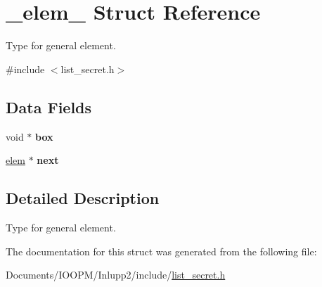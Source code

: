 \hypertarget{struct__elem__}{}\section{\+\_\+elem\+\_\+ Struct Reference}
\label{struct__elem__}


Type for general element.  




{\ttfamily \#include $<$list\+\_\+secret.\+h$>$}

\subsection*{Data Fields}
\begin{DoxyCompactItemize}
\item 
\hypertarget{struct__elem___af06c82a131c92d169d94c8602c64f757}{}void $\ast$ {\bfseries box}\label{struct__elem___af06c82a131c92d169d94c8602c64f757}

\item 
\hypertarget{struct__elem___a3f6417aeec27282903f7e8a406173713}{}\hyperlink{struct__elem__}{elem} $\ast$ {\bfseries next}\label{struct__elem___a3f6417aeec27282903f7e8a406173713}

\end{DoxyCompactItemize}


\subsection{Detailed Description}
Type for general element. 

The documentation for this struct was generated from the following file\+:\begin{DoxyCompactItemize}
\item 
Documents/\+I\+O\+O\+P\+M/\+Inlupp2/include/\hyperlink{list__secret_8h}{list\+\_\+secret.\+h}\end{DoxyCompactItemize}
